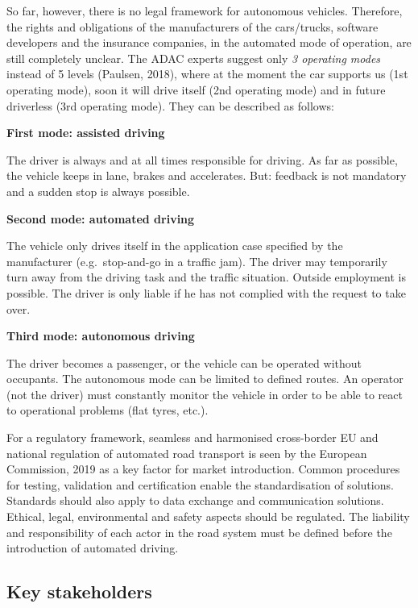 \documentclass[
]{book}
\begin{document}
So far, however, there is no legal framework for autonomous vehicles. Therefore, the rights and obligations of the manufacturers of the cars/trucks, software developers and the insurance companies, in the automated mode of operation, are still completely unclear. The ADAC experts suggest only \emph{3 operating modes} instead of 5 levels (Paulsen, 2018), where at the moment the car supports us (1st operating mode), soon it will drive itself (2nd operating mode) and in future driverless (3rd operating mode). They can be described as follows:

\textbf{First mode: assisted driving}

The driver is always and at all times responsible for driving. As far as possible, the vehicle keeps in lane, brakes and accelerates. But: feedback is not mandatory and a sudden stop is always possible.

\textbf{Second mode: automated driving}

The vehicle only drives itself in the application case specified by the manufacturer (e.g.~stop-and-go in a traffic jam). The driver may temporarily turn away from the driving task and the traffic situation. Outside employment is possible. The driver is only liable if he has not complied with the request to take over.

\textbf{Third mode: autonomous driving}

The driver becomes a passenger, or the vehicle can be operated without occupants. The autonomous mode can be limited to defined routes. An operator (not the driver) must constantly monitor the vehicle in order to be able to react to operational problems (flat tyres, etc.).

For a regulatory framework, seamless and harmonised cross-border EU and national regulation of automated road transport is seen by the European Commission, 2019 as a key factor for market introduction. Common procedures for testing, validation and certification enable the standardisation of solutions. Standards should also apply to data exchange and communication solutions. Ethical, legal, environmental and safety aspects should be regulated. The liability and responsibility of each actor in the road system must be defined before the introduction of automated driving.

\hypertarget{key-stakeholders-22}{%
\subsection*{Key stakeholders}\label{key-stakeholders-22}}
\end{document}
